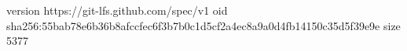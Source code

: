 version https://git-lfs.github.com/spec/v1
oid sha256:55bab78e6b36b8afccfec6f3b7b0c1d5cf2a4ec8a9a0d4fb14150c35d5f39e9e
size 5377
